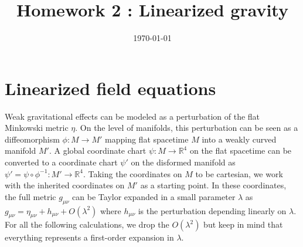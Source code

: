 \documentclass[10pt, a4paper]{article}
\title{Homework 2 : Linearized gravity
} %
\author{\PA} %
\date{\today} %
\begin{document}
\maketitlepage

\maketableofcontents


\section{Linearized field equations}
\footnotesize{
Weak gravitational effects can be modeled as a perturbation of the flat Minkowski metric $\eta$. On the level of manifolds, this perturbation can be seen as a diffeomorphism $\phi : M \to M'$ mapping flat spacetime $M$ into a weakly curved manifold $M'$. A global coordinate chart $\psi : M \to \mathbb{R}^4$ on the flat spacetime can be converted to a coordinate chart $\psi'$ on the disformed manifold as $\psi' = \psi \circ \phi^{-1} : M' \to \mathbb{R}^4$. Taking the coordinates on $M$ to be cartesian, we work with the inherited coordinates on $M'$ as a starting point. In these coordinates, the full metric $g_{\mu\nu}$ can be Taylor expanded in a small parameter $\lambda$ as $g_{\mu\nu} = \eta_{\mu \nu} + h_{\mu \nu} + O(\lambda^2)$ where $h_{\mu \nu}$ is the perturbation depending linearly on $\lambda$. For all the following calculations, we drop the $O(\lambda^2)$ but keep in mind that everything represents a first-order expansion in $\lambda$.

}
\end{document}
